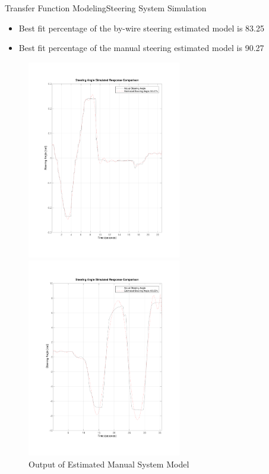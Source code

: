 \documentclass{beamer}
\begin{document}
\begin{frame}{Transfer Function Modeling}{Steering System Simulation}
	\begin{block}{}
 \begin{itemize}
	\item Best fit percentage of the by-wire steering estimated model is 83.25
	\item Best fit percentage of the manual steering estimated model is 90.27
 \end{itemize}
 \begin{figure}
    \centering
    \begin{minipage}{0.45\textwidth}
        \centering
        \includegraphics[width=0.6\textwidth]{figs/img/byWireSteeringTransferFunctionModel} %
        \caption{Output of Estimated By-Wire System Model}
        \label{fig:byWireSteerModel}
    \end{minipage}\hfill
    \begin{minipage}{0.45\textwidth}
        \centering
        \includegraphics[width=0.6\textwidth]{figs/img/manualSteeringTransferFunctionModel} %
        \caption{Output of Estimated Manual System Model}
        \label{fig:manualSteerModel}
    \end{minipage}
\end{figure}
  \end{block}
\end{frame}
\end{document}
